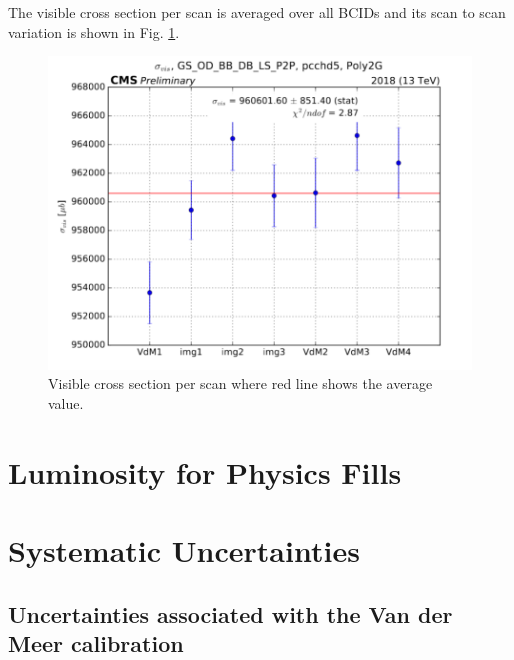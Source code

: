 The visible cross section per scan is averaged over all BCIDs and its scan to scan variation is shown in Fig. \ref{fig:sigmaperscan}.


\begin{figure}[h]
    \centering
    \includegraphics[width=1\textwidth]{ashish_thesis/sigma_vis_per_scan.png}
    \caption[PCC visible cross section]{Visible cross section per scan where red line shows the average value.}
    \label{fig:sigmaperscan}
\end{figure}



\section{Luminosity for Physics Fills}


\section{Systematic Uncertainties}


\subsection{Uncertainties associated with the Van der Meer calibration}

